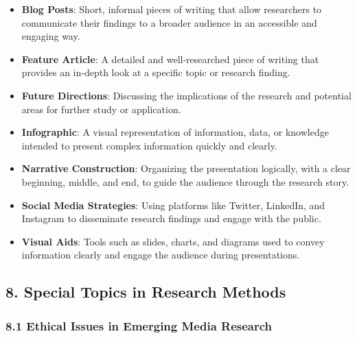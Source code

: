 \documentclass[
]{book}
\providecommand{\tightlist}{%
  \setlength{\itemsep}{0pt}\setlength{\parskip}{0pt}}
\begin{document}
\begin{itemize}
\tightlist
\item
  \textbf{Blog Posts}: Short, informal pieces of writing that allow researchers to communicate their findings to a broader audience in an accessible and engaging way.
\item
  \textbf{Feature Article}: A detailed and well-researched piece of writing that provides an in-depth look at a specific topic or research finding.
\item
  \textbf{Future Directions}: Discussing the implications of the research and potential areas for further study or application.
\item
  \textbf{Infographic}: A visual representation of information, data, or knowledge intended to present complex information quickly and clearly.
\item
  \textbf{Narrative Construction}: Organizing the presentation logically, with a clear beginning, middle, and end, to guide the audience through the research story.
\item
  \textbf{Social Media Strategies}: Using platforms like Twitter, LinkedIn, and Instagram to disseminate research findings and engage with the public.
\item
  \textbf{Visual Aids}: Tools such as slides, charts, and diagrams used to convey information clearly and engage the audience during presentations.
\end{itemize}

\subsection*{\texorpdfstring{8. \textbf{Special Topics in Research Methods}}{8. Special Topics in Research Methods}}\label{special-topics-in-research-methods-1}

\subsubsection*{\texorpdfstring{\textbf{8.1 Ethical Issues in Emerging Media Research}}{8.1 Ethical Issues in Emerging Media Research}}\label{ethical-issues-in-emerging-media-research-1}
\end{document}
